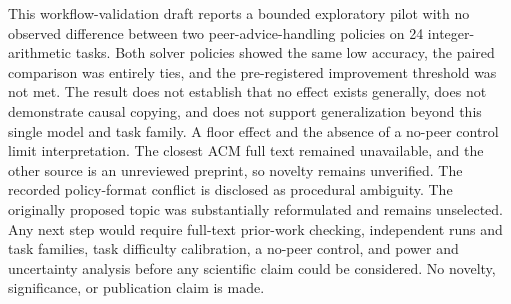 \documentclass{article}
\begin{document}
This workflow-validation draft reports a bounded exploratory pilot with no observed difference between two peer-advice-handling policies on 24 integer-arithmetic tasks. Both solver policies showed the same low accuracy, the paired comparison was entirely ties, and the pre-registered improvement threshold was not met. The result does not establish that no effect exists generally, does not demonstrate causal copying, and does not support generalization beyond this single model and task family. A floor effect and the absence of a no-peer control limit interpretation. The closest ACM full text remained unavailable, and the other source is an unreviewed preprint, so novelty remains unverified. The recorded policy-format conflict is disclosed as procedural ambiguity. The originally proposed topic was substantially reformulated and remains unselected. Any next step would require full-text prior-work checking, independent runs and task families, task difficulty calibration, a no-peer control, and power and uncertainty analysis before any scientific claim could be considered. No novelty, significance, or publication claim is made.




\end{document}
